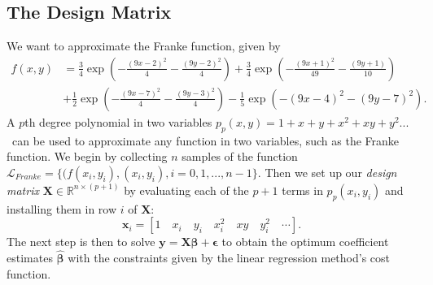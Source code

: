 \documentclass[]{article}
\begin{document}
\subsection{The Design Matrix}
We want to approximate the Franke function, given by
\begin{equation}
\label{franke}
\begin{aligned}
f(x,y) &= \frac{3}{4}\exp{\left(-\frac{(9x-2)^2}{4} - \frac{(9y-2)^2}{4}\right)}+\frac{3}{4}\exp{\left(-\frac{(9x+1)^2}{49}- \frac{(9y+1)}{10}\right)} \\
&+\frac{1}{2}\exp{\left(-\frac{(9x-7)^2}{4} - \frac{(9y-3)^2}{4}\right)} -\frac{1}{5}\exp{\left(-(9x-4)^2 - (9y-7)^2\right) }.
\end{aligned}
\end{equation}
A $p$th degree polynomial in two variables $p_p(x,y) = 1 + x + y + x^2 + xy + y^2 ...$ can be used to approximate any function in two variables, such as the Franke function. We begin by collecting $n$ samples of the function $\mathcal{L}_{Franke} = \{(f(x_i, y_i), (x_i, y_i), i=0,1,...,n-1\}$. Then we set up our \textit{design matrix} $\mathbf{X} \in \mathbb{R}^{n \times (p+1)}$ by evaluating each of the $p+1$ terms in $p_p(x_i,y_i)$ and installing them in row $i$ of $\mathbf{X}$:
\begin{equation}
\mathbf{x}_i = [1 \quad x_i \quad y_i \quad x_i^2 \quad xy \quad y_i^2 \quad \cdots].
\end{equation}
The next step is then to solve $\mathbf{y} = \mathbf{X\beta} + \mathbf{\epsilon}$ to obtain the optimum coefficient estimates $\mathbf{\hat{\beta}}$ with the constraints given by the linear regression method's cost function.
\end{document}

